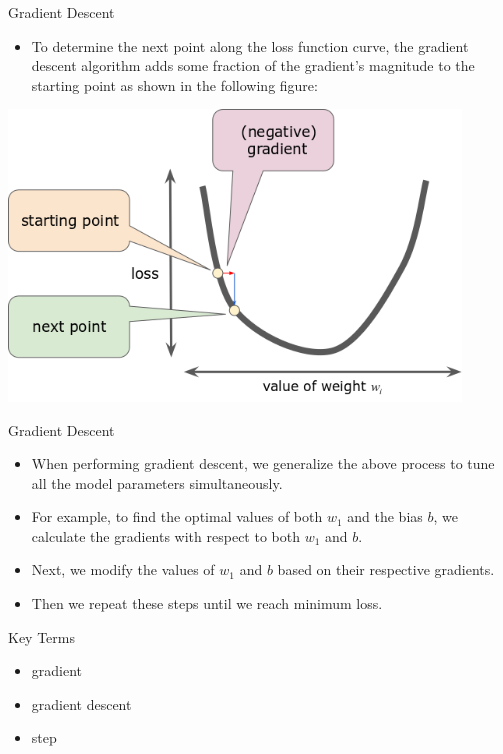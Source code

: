 \documentclass{beamer}
\begin{document}
\begin{frame}{Gradient Descent}
\begin{itemize}
    \item To determine the next point along the loss function curve, the gradient descent algorithm adds some fraction of the gradient's magnitude to the starting point as shown in the following figure:
\end{itemize}
\includegraphics[width=0.9\textwidth]{images/GradientDescentGradientStep.png}
\end{frame}


\begin{frame}{Gradient Descent}
\begin{itemize}
    \item When performing gradient descent, we generalize the above process to tune all the model parameters simultaneously. 
    
    \item For example, to find the optimal values of both $w_1$ and the bias $b$, we calculate the gradients with respect to both $w_1$ and $b$. 
    
    \item Next, we modify the values of $w_1$ and $b$ based on their respective gradients. 
    \item Then we repeat these steps until we reach minimum loss.
\end{itemize}
\end{frame}


\begin{frame}{Key Terms}
\begin{itemize}
    \item gradient
    \item gradient descent
    \item step
\end{itemize}
\end{frame}
\end{document}
